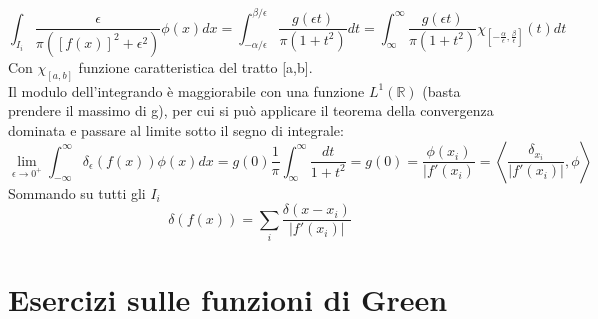 \documentclass[twoside]{article}
\begin{document}
\begin{equation}
    \int_{I_i}\frac{\epsilon}{\pi([f(x)]^2+\epsilon^2)}
    \phi(x)dx=\int_{-\alpha/\epsilon}^{\beta/\epsilon}\frac{g(\epsilon t)}{\pi (1+t^2)}dt=\int_\infty^\infty\frac{g(\epsilon t)}{\pi (1+t^2)}\chi_{[-\frac{\alpha}{\epsilon},\frac{\beta}{\epsilon}]}(t)dt
\end{equation}
Con $\chi_{[a,b]}$ funzione caratteristica del tratto [a,b].\\
Il modulo dell'integrando è maggiorabile con una funzione $L^1(\mathbb{R})$ (basta prendere il massimo di g), per cui si può applicare il teorema della convergenza dominata e passare al limite sotto il segno di integrale:
\begin{equation}
    \lim_{\epsilon\to 0^+}\int_{-\infty}^{\infty}\delta_{\epsilon}(f(x))\phi(x)dx= g(0)\frac{1}{\pi}\int_\infty^\infty\frac{dt}{1+t^2}=g(0)=\frac{\phi(x_i)}{|f'(x_i)}=\left<  \frac{\delta_{x_i}}{|f'(x_i)|},\phi \right>
\end{equation}
Sommando su tutti gli $I_i$
\begin{equation}
    \delta(f(x))=\sum_i \frac{\delta(x-x_i)}{|f'(x_i)|}
\end{equation}
\newpage
\section{Esercizi sulle funzioni di Green}
\end{document}
